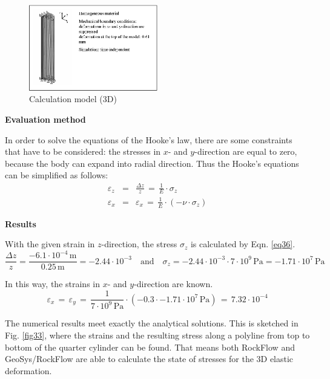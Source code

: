 \begin{figure}[htbp]
\centering
\includegraphics[width=0.5\textwidth]{M/figures/fig32.eps}
\caption{Calculation model (3D)}
\label{fig32}
\end{figure}

\newpage

\textbf{Evaluation method}

In order to solve the equations of the Hooke's law, there are some constraints that have to be considered: the stresses in $x$- and $y$-direction are equal to zero, because the body can expand into radial direction. Thus the Hooke's equations can be simplified as follows:
\begin{eqnarray}
\varepsilon_z & = &
\frac{\Delta z}{z}\,=\,\frac{1}{E}\cdot\sigma_z
\label{eq36} \\[1.5ex]
\varepsilon_x & = &
\varepsilon_x\,=\,\frac{1}{E}\cdot\left(-\nu\cdot\sigma_z\right)
\label{eq37}
\end{eqnarray}

\textbf{Results}

With the given strain in $z$-direction, the stress $\sigma_z$ is calculated by Eqn. \ref{eq36}.
\begin{displaymath}
\frac{\Delta z}{z}=\frac{-6.1\cdot 10^{-4}\,\mathrm{m}}{0.25\,\mathrm{m}}=-2.44\cdot 10^{-3}
\quad\mathrm{and}\quad
\sigma_z=-2.44\cdot 10^{-3}\cdot 7\cdot 10^{9}\,\mathrm{Pa}=
-1.71\cdot 10^{7}\,\mathrm{Pa}
\end{displaymath}

In this way, the strains in $x$- and $y$-direction are known.
\begin{displaymath}
\varepsilon_x\,=\,\varepsilon_y\,=\,
\frac{1}{7\cdot 10^{9}\,\mathrm{Pa}}\cdot
\left(-0.3\cdot-1.71\cdot 10^{7}\,\mathrm{Pa}\right)\,=\,
7.32\cdot 10^{-4}
\end{displaymath}

The numerical results meet exactly the analytical solutions. This is sketched in Fig. \ref{fig33}, where the strains and the resulting stress along a polyline from top to bottom of the quarter cylinder can be found. That means both RockFlow and GeoSys/RockFlow are able to calculate the state of stresses for the 3D elastic deformation.

